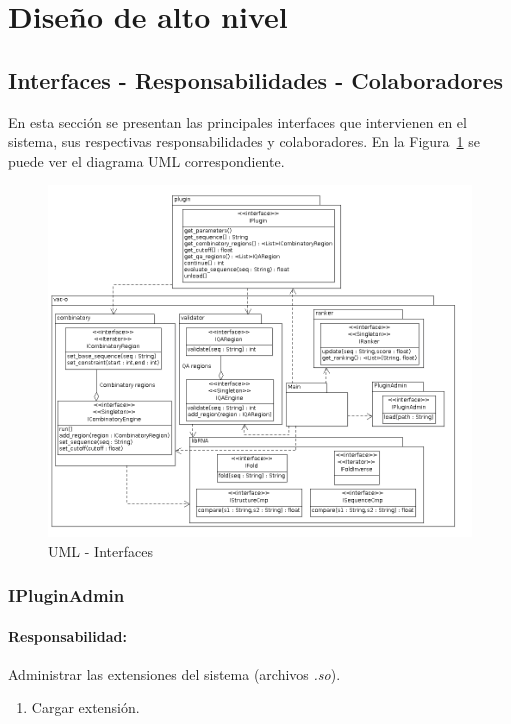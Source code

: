 \section{Dise\~no de alto nivel}
\label{hld}
\subsection{Interfaces - Responsabilidades - Colaboradores}
En esta secci\'on se presentan las principales interfaces que intervienen en el
sistema, sus respectivas responsabilidades y colaboradores. En la
Figura~\ref{uml:hld} se puede ver el diagrama UML correspondiente.
\begin{figure}
  \centering
  \includegraphics[scale=0.5, angle=90]{hld.png}  
  \caption{UML - Interfaces}
  \label{uml:hld}
\end{figure}

  \subsubsection{IPluginAdmin}
    \paragraph{Responsabilidad:} Administrar las extensiones del sistema
(archivos \textit{.so}).    
      \begin{enumerate}
       \item Cargar extensi\'on.       
      \end{enumerate}    

